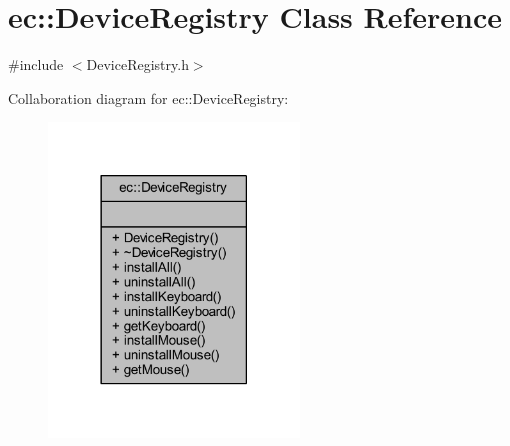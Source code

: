 \hypertarget{classec_1_1_device_registry}{}\section{ec\+:\+:Device\+Registry Class Reference}
\label{classec_1_1_device_registry}


{\ttfamily \#include $<$Device\+Registry.\+h$>$}



Collaboration diagram for ec\+:\+:Device\+Registry\+:\nopagebreak
\begin{figure}[H]
\begin{center}
\leavevmode
\includegraphics[width=189pt]{classec_1_1_device_registry__coll__graph}
\end{center}
\end{figure}
